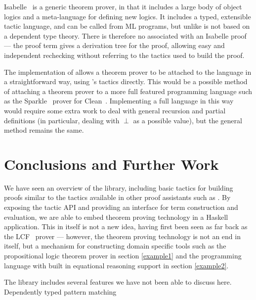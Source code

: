 Isabelle~\cite{isabelle} is a
generic theorem prover, in that it includes a large body of object
logics and a meta-language for defining new logics. It includes a
typed, extensible tactic language, and can be called from ML programs,
but unlike \Ivor{} is not based on a dependent type theory.
There is therefore no  associated with an Isabelle
proof --- the proof term gives a derivation tree for the
proof, allowing easy and independent rechecking without referring to
the tactics used to build the proof. 

The implementation of \Funl{} allows a theorem prover to be attached
to the language in a straightforward way, using \Ivor{}'s tactics
directly. This would be a possible method of attaching a theorem
prover to a more full featured programming language such as the
Sparkle~\cite{sparkle} prover for Clean~\cite{clean}. Implementing a
full language in this way would require some extra work to deal
with general recursion and partial definitions (in particular, dealing
with $\perp$ as a possible value), but the general method remains the same.

\section{Conclusions and Further Work}

We have seen an overview of the \Ivor{} library, including basic
tactics for building proofs similar to the tactics available in other
proof assistants such as \Coq{}. By exposing the tactic API and
providing an interface for term construction and evaluation, we are
able to embed theorem proving technology in a Haskell
application. This in itself is not a new idea, having first been seen
as far back as the LCF~\cite{lcf-milner} prover --- however, the
theorem proving technology is not an end in itself, but a
mechanism for constructing domain specific tools such as the
propositional logic theorem prover in section \ref{example1} and the
programming language with built in equational reasoning support in
section \ref{example2}.

The library includes several features we have not been able to discuss
here. Dependently typed pattern matching 

